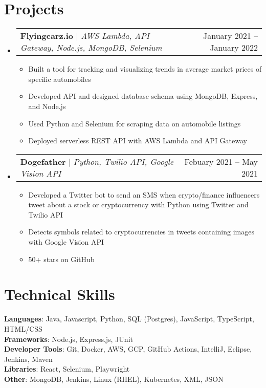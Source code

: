 \documentclass[letterpaper,11pt]{article}
\makeatletter
\newcommand{\resumeItem}[1]{
  \item\small{
    {#1 \vspace{-2pt}}
  }
}
\newcommand{\resumeProjectHeading}[2]{
    \item
    \begin{tabular*}{0.97\textwidth}{l@{\extracolsep{\fill}}r}
      \small#1 & #2 \\
    \end{tabular*}\vspace{-7pt}
}
\newcommand{\resumeSubHeadingListStart}{\begin{itemize}[leftmargin=0.15in, label={}]}
\newcommand{\resumeSubHeadingListEnd}{\end{itemize}}
\newcommand{\resumeItemListStart}{\begin{itemize}}
\newcommand{\resumeItemListEnd}{\end{itemize}\vspace{-5pt}}
\makeatother
\begin{document}
\section{Projects}
    \resumeSubHeadingListStart
      \resumeProjectHeading
          {\textbf{Flyingcarz.io} $|$ \emph{AWS Lambda, API Gateway, Node.js, MongoDB, Selenium}}{January 2021 -- January 2022}
          \resumeItemListStart
            \resumeItem{Built a tool for tracking and visualizing trends in average market prices of specific automobiles}
            \resumeItem{Developed API and designed database schema using MongoDB, Express, and Node.js}
            \resumeItem{Used Python and Selenium for scraping data on automobile listings}
            \resumeItem{Deployed serverless REST API with AWS Lambda and API Gateway}
          \resumeItemListEnd
      \resumeProjectHeading
          {\textbf{Dogefather} $|$ \emph{Python, Twilio API, Google Vision API}}{Febuary 2021 -- May 2021}
          \resumeItemListStart
            \resumeItem{Developed a Twitter bot to send an SMS when crypto/finance influencers tweet about a stock or
            cryptocurrency with Python using Twitter and Twilio API}
            \resumeItem{Detects symbols related to cryptocurrencies in tweets containing images with Google Vision API}
            \resumeItem{50+ stars on GitHub}
          \resumeItemListEnd
    \resumeSubHeadingListEnd



%
\section{Technical Skills}
 \begin{itemize}[leftmargin=0.15in, label={}]
    \small{\item{
     \textbf{Languages}{: Java, Javascript, Python, SQL (Postgres), JavaScript, TypeScript, HTML/CSS} \\
     \textbf{Frameworks}{: Node.js, Express.js, JUnit} \\
     \textbf{Developer Tools}{: Git, Docker, AWS, GCP, GitHub Actions, IntelliJ, Eclipse, Jenkins, Maven} \\
     \textbf{Libraries}{: React, Selenium, Playwright} \\
     \textbf{Other}{: MongoDB, Jenkins, Linux (RHEL), Kubernetes, XML, JSON}
    }}
 \end{itemize}


\end{document}
